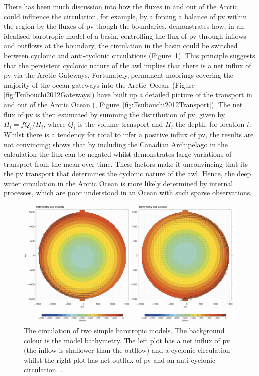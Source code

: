 \documentclass[10pt,a4paper]{article}
\begin{document}
There has been much discussion
into how the fluxes in and out of the Arctic could influence the circulation,
for example, by a forcing a balance of \gls{pv} within the region by
the fluxes of \gls{pv} though the boundaries. \cite{yang2005arctic} demonstrates how,
in an idealised barotropic model of a basin, controlling the flux 
of \gls{pv} through inflows and outflows
at the boundary, the circulation in the basin could be switched between cyclonic and
anti-cyclonic circulations (Figure~\ref{fig:Yang2005}). This principle suggests
that the persistent cyclonic nature of the \gls{awl} implies that there is a 
net influx of \gls{pv} via the Arctic Gateways. Fortunately, permanent moorings 
covering the majority of the ocean gateways into the Arctic~Ocean~(Figure
\ref{fig:Tsubouchi2012Gateways}) have built
up a detailed picture of the transport in and out of the Arctic Ocean 
(\cite{tsubouchi2012arctic}, Figure~\ref{fig:Tsubouchi2012Transport}). The net flux of \gls{pv} is then estimated by summing the distribution of \gls{pv}; given by $ \Pi_{i} = fQ_{i}/H_{i}$,
where $Q_{i}$ is the volume transport and $H_i$ the depth, for location $i$. 
Whilst there is a tendency for total to infer a positive influx of \gls{pv}, the
results are not convincing; \cite{munchow2006observational} shows that by including the
Canadian Archipelago in the \cite{yang2005arctic} calculation the flux can be negated whilst
\cite{tsubouchi2012arctic} demonstrates large variations of transport from the mean over time.
These factors make it unconvincing that its the \gls{pv} transport that determines the 
cyclonic nature of the \gls{awl}.
Hence, the deep water circulation in the Arctic Ocean is more likely determined by 
internal processes, which are poor understood in an Ocean with such sparse observations.

\begin{figure}
	\centering
	\includegraphics[width=\linewidth]{Yang2005}
	\caption[\cite{yang2005arctic}]{ The circulation of two simple barotropic
		models. The background colour is the model bathymetry. The left plot has
		a net influx of \gls{pv} (the inflow is shallower than the outflow) 
		and a cyclonic circulation whilst the right plot has net outflux of  \gls{pv} 
		and an anti-cyclonic circulation. \cite{yang2005arctic}.}
	\label{fig:Yang2005}
\end{figure}
\end{document}
